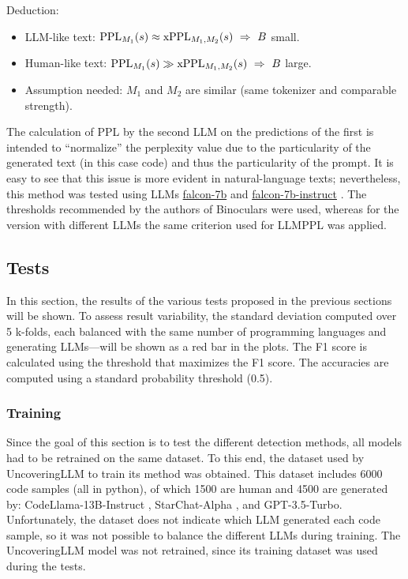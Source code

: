 Deduction:
\begin{itemize}
\item LLM-like text: $\mathrm{PPL}_{M_1}(s)\approx \mathrm{xPPL}_{M_1,M_2}(s)\ \Rightarrow\ B$ small.
\item Human-like text: $\mathrm{PPL}_{M_1}(s)\gg \mathrm{xPPL}_{M_1,M_2}(s)\ \Rightarrow\ B$ large.
\item Assumption needed: $M_1$ and $M_2$ are similar (same tokenizer and comparable strength).
\end{itemize}
The calculation of PPL by the second LLM on the predictions of 
the first is intended to “normalize” the perplexity value due to 
the particularity of the generated text (in this case code) and thus 
the particularity of the prompt. It is easy to see that this issue 
is more evident in natural-language texts; nevertheless, this 
method was tested using LLMs 
\href{https://huggingface.co/tiiuae/falcon-7b}{falcon-7b} and 
\href{https://huggingface.co/tiiuae/falcon-7b-instruct}{falcon-7b-instruct}
\cite{falcon40b}. The thresholds recommended by the 
authors of Binoculars were used, whereas for the version with different 
LLMs the same criterion used for LLMPPL was applied.







\clearpage
\subsection{Tests}
In this section, the results of the various tests proposed in the previous sections will be shown.
To assess result variability, the standard deviation computed over 5 k-folds, 
each balanced with the same number of programming languages and generating 
LLMs—will be shown as a red bar in the plots.
The F1 score is calculated using the threshold that maximizes the F1 score.
The accuracies are computed using a standard probability threshold (0.5).

\subsubsection{Training}
Since the goal of this section is to test the different detection methods, 
all models had to be retrained on the same dataset. To this end, the dataset 
used by UncoveringLLM \cite{oedingen2024chatgpt} to train its method was obtained. 
This dataset includes 
6000 code samples (all in python), of which 1500 are human and 4500 are generated by: 
CodeLlama-13B-Instruct \cite{roziere2023code}, 
StarChat-Alpha \cite{Tunstall2023starchat-alpha}, 
and GPT-3.5-Turbo. 
Unfortunately, 
the dataset does not indicate which LLM generated each code sample, so it 
was not possible to balance the different LLMs during training. The 
UncoveringLLM model was not retrained, since its training dataset was used 
during the tests.


